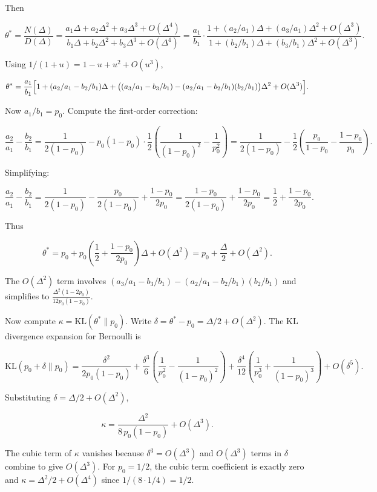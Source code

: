 \documentclass[
  12pt,
]{article}
\begin{document}
Then

\[
\theta^* = \frac{N(\Delta)}{D(\Delta)} = \frac{a_1\Delta + a_2\Delta^2 + a_3\Delta^3 + O(\Delta^4)}{b_1\Delta + b_2\Delta^2 + b_3\Delta^3 + O(\Delta^4)}
= \frac{a_1}{b_1} \cdot \frac{1 + (a_2/a_1)\Delta + (a_3/a_1)\Delta^2 + O(\Delta^3)}{1 + (b_2/b_1)\Delta + (b_3/b_1)\Delta^2 + O(\Delta^3)}.
\]

Using \(1/(1+u) = 1 - u + u^2 + O(u^3)\),

\[
\theta^* = \frac{a_1}{b_1}\Bigl[1 + (a_2/a_1 - b_2/b_1)\Delta + \bigl((a_3/a_1 - b_3/b_1) - (a_2/a_1 - b_2/b_1)(b_2/b_1)\bigr)\Delta^2 + O(\Delta^3)\Bigr].
\]

Now \(a_1/b_1 = p_0\). Compute the first-order correction:

\[
\frac{a_2}{a_1} - \frac{b_2}{b_1}
= \frac{1}{2(1-p_0)} - p_0(1-p_0)\cdot\frac{1}{2}\!\left(\frac{1}{(1-p_0)^2} - \frac{1}{p_0^2}\right)
= \frac{1}{2(1-p_0)} - \frac{1}{2}\!\left(\frac{p_0}{1-p_0} - \frac{1-p_0}{p_0}\right).
\]

Simplifying:

\[
\frac{a_2}{a_1} - \frac{b_2}{b_1}
= \frac{1}{2(1-p_0)} - \frac{p_0}{2(1-p_0)} + \frac{1-p_0}{2p_0}
= \frac{1-p_0}{2(1-p_0)} + \frac{1-p_0}{2p_0}
= \frac{1}{2} + \frac{1-p_0}{2p_0}.
\]

Thus

\[
\theta^* = p_0 + p_0\left(\frac{1}{2} + \frac{1-p_0}{2p_0}\right)\Delta + O(\Delta^2)
= p_0 + \frac{\Delta}{2} + O(\Delta^2).
\]

The \(O(\Delta^2)\) term involves
\((a_3/a_1 - b_3/b_1) - (a_2/a_1 - b_2/b_1)(b_2/b_1)\) and simplifies to
\(\frac{\Delta^2(1-2p_0)}{12 p_0(1-p_0)}\).

Now compute \(\kappa = \text{KL}(\theta^*\|p_0)\). Write
\(\delta = \theta^* - p_0 = \Delta/2 + O(\Delta^2)\). The KL divergence
expansion for Bernoulli is

\[
\text{KL}(p_0+\delta\|p_0) = \frac{\delta^2}{2p_0(1-p_0)}
+ \frac{\delta^3}{6}\!\left(\frac{1}{p_0^2} - \frac{1}{(1-p_0)^2}\right)
+ \frac{\delta^4}{12}\!\left(\frac{1}{p_0^3} + \frac{1}{(1-p_0)^3}\right) + O(\delta^5).
\]

Substituting \(\delta = \Delta/2 + O(\Delta^2)\),

\[
\kappa = \frac{\Delta^2}{8\,p_0(1-p_0)} + O(\Delta^3).
\]

The cubic term of \(\kappa\) vanishes because \(\delta^3 = O(\Delta^3)\)
and \(O(\Delta^3)\) terms in \(\delta\) combine to give \(O(\Delta^3)\).
For \(p_0=1/2\), the cubic term coefficient is exactly zero and
\(\kappa = \Delta^2/2 + O(\Delta^4)\) since \(1/(8\cdot 1/4) = 1/2\).
\end{document}
